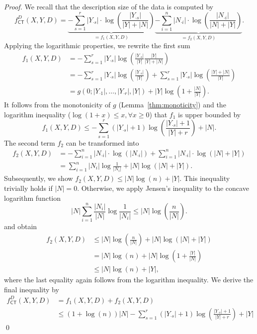 \begin{proof}
We recall that the description size of the data is computed by
\[f_{\mathsf{CT}}^D(X,Y,D)=\underbrace{-\sum_{s=1}^r |Y_{\cdot s}| \cdot \log\left(\frac{|Y_{\cdot s}|}{|Y|+|N|}\right)}_{=f_1(X,Y,D)}
       \underbrace{-\sum_{i=1}^n |N_{\cdot i}| \cdot \log\left(\frac{|N_{\cdot i}|}{|N|+|Y|}\right)}_{=f_2(X,Y,D)}.
\]
Applying the logarithmic properties, we rewrite the first sum 
\begin{align*}
 f_1(X,Y,D)&= -\sum_{s=1}^r|Y_{\cdot s}|\log\left(\frac{|Y_{\cdot s}|}{|Y|}\frac{|Y|}{|Y|+|N|}\right)\\
 &= -\sum_{s=1}^r|Y_{\cdot s}|\log\left(\frac{|Y_{\cdot s}|}{|Y|}\right)+\sum_{s=1}^r|Y_{\cdot s}|\log\left(\frac{|Y|+|N|}{|Y|}\right)\\
 &= g(0;|Y_{\cdot 1}|,\ldots,|Y_{\cdot r}|,|Y|) +|Y|\log\left(1+\frac{|N|}{|Y|}\right). %
\end{align*}
It follows from the monotonicity of $g$ (Lemma~\ref{thm:monoticity}) and the logarithm inequality ($\log(1+x)\leq x, \forall x\geq 0$) that $f_1$ is upper bounded by
\[f_1(X,Y,D)\leq-\sum_{s=1}^r(|Y_{\cdot s}|+1)\log\left(\frac{|Y_{\cdot s}|+1}{|Y|+r}\right)+|N|.\]
The second term $f_2$ can be transformed into
\begin{align*}
    f_2(X,Y,D)&=-\sum_{i=1}^n |N_{\cdot i}| \cdot \log\left(|N_{\cdot i}|\right)+\sum_{i=1}^n |N_{\cdot i}| \cdot \log\left(|N|+|Y|\right)\\
    &= \sum_{i=1}^n|N_i|\log\frac{1}{|N_i|} +|N|\log(|N|+|Y|).
\end{align*}
Subsequently, we show $f_2(X,Y,D)\leq |N|\log(n) +|Y|$. This inequality trivially holds if $|N|=0$. Otherwise, we apply Jensen's inequality to the concave logarithm function
	\[|N|\sum_{i=1}^n\frac{|N_i|}{|N|}\log\frac{1}{|N_i|}\leq |N|\log\left(\frac{n}{|N|}\right).\]
and obtain 
\begin{align*}
    f_2(X,Y,D)&\leq|N|\log\left(\frac{n}{|N|}\right) +|N|\log(|N|+|Y|)\\ &= |N|\log(n) +|N|\log\left(1+\frac{|Y|}{|N|}\right) \\
    &\leq |N|\log(n) +|Y|,
\end{align*}
where the last equality again follows from the logarithm inequality. We derive the final inequality by
\begin{align*}
f_{\mathsf{CT}}^D(X,Y,D) &= f_1(X,Y,D)+f_2(X,Y,D)\\
&\leq (1+\log(n))|N|-\sum_{s=1}^r(|Y_{\cdot s}|+1)\log\left(\frac{|Y_{\cdot s}|+1}{|Y|+r}\right)+|Y|
\end{align*}
\qed
\end{proof}

